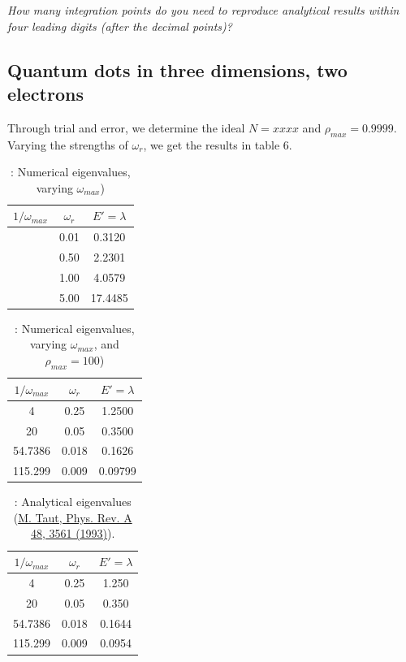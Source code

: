 \documentclass{article}
\begin{document}
		\textit{How many integration points do you need to reproduce analytical results
		within four leading digits (after the decimal points)?}

	\subsection{Quantum dots in three dimensions, two electrons}
		Through trial and error, we determine the ideal $N = xxxx$ and $\rho_{max} = 0.9999$.
		Varying the strengths of $\omega_r$, we get the results in table 6.

		\begin{table}[h!]
			\caption{: Numerical eigenvalues, varying $\omega_{max}$)}
			\begin{tabular}{c c c}
				$1/\omega_{max}$ & $\omega_r$ & $E' = \lambda$ \\
				\hline
				& 0.01 & 0.3120 \\
				& 0.50 & 2.2301 \\
				& 1.00 & 4.0579 \\
			  & 5.00 & 17.4485 \\
			\end{tabular}
		\end{table}


				\begin{table}[h!]
					\caption{: Numerical eigenvalues, varying $\omega_{max}$, and $\rho_{max} = 100$)}
					\begin{tabular}{c c c}
						$1/\omega_{max}$ & $\omega_r$ & $E' = \lambda$ \\
						\hline
						4 & 0.25 & 1.2500 \\
						20 & 0.05 & 0.3500 \\
						54.7386 & 0.018 & 0.1626 \\
						115.299 & 0.009 & 0.09799 \\
					\end{tabular}
				\end{table}

		\begin{table}[h!]
			\caption{: Analytical eigenvalues (\href{http://prola.aps.org/abstract/PRA/v48/i5/p3561_1}{M. Taut, Phys. Rev. A 48, 3561 (1993)}).}
			\begin{tabular}{c c c}
				$1/\omega_{max}$ & $\omega_r$ & $E' = \lambda$ \\
				\hline
				4 & 0.25 & 1.250\\
				20 & 0.05 & 0.350 \\
				54.7386 & 0.018 & 0.1644 \\
				115.299 & 0.009 & 0.0954 \\
			\end{tabular}
		\end{table}
\end{document}
